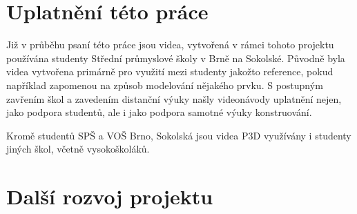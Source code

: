 \chapter{Uplatnění této práce}
Již v průběhu psaní této práce jsou videa, vytvořená v rámci tohoto projektu používána studenty Střední průmyslové školy v Brně na Sokolské.
Původně byla videa vytvořena primárně pro využití mezi studenty jakožto reference, pokud například zapomenou na způsob modelování nějakého prvku.
S postupným zavřením škol a zavedením distanční výuky našly videonávody uplatnění nejen, jako podpora studentů, ale i jako podpora samotné výuky konstruování.

Kromě studentů SPŠ a VOŠ Brno, Sokolská jsou videa P3D využívány i studenty jiných škol, včetně vysokoškoláků.

\newpage

\chapter{Další rozvoj projektu}


\newpage